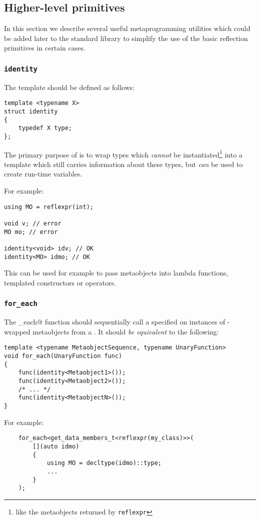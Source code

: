 \subsection{Higher-level primitives}

In this section we describe several useful metaprogramming utilities which
could be added later to the standard library to simplify the use of the basic
reflection primitives in certain cases.
 
\subsubsection{\texttt{identity}}

The \verb@identity@ template should be defined as follows:

\begin{verbatim}
template <typename X>
struct identity
{
	typedef X type;
};
\end{verbatim}

The primary purpose of \verb@identity@ is to wrap types which {\em cannot} be
instantiated\footnote{like the metaobjects returned by \texttt{reflexpr}}
into a template which still carries information about these types, but
{\em can} be used to create run-time variables.

For example:

\begin{verbatim}
using MO = reflexpr(int);

void v; // error
MO mo; // error

identity<void> idv; // OK
identity<MO> idmo; // OK
\end{verbatim}
 
This can be used for example to pass metaobjects into lambda functions,
templated constructors or operators. 

\subsubsection{\texttt{for\_each}}

The \verb@for_each@ function should sequentially call a specified
\verb@UnaryFunction@ on instances of \verb@identity@-wrapped metaobjects from
a . It should {\em be equivalent} to the following:

\begin{verbatim}
template <typename MetaobjectSequence, typename UnaryFunction>
void for_each(UnaryFunction func)
{
	func(identity<Metaobject1>());
	func(identity<Metaobject2>());
	/* ... */
	func(identity<MetaobjectN>());
}
\end{verbatim}

For example:

\begin{verbatim}
	for_each<get_data_members_t<reflexpr(my_class)>>(
		[](auto idmo)
		{
			using MO = decltype(idmo)::type;
			...
		}
	);
\end{verbatim}

